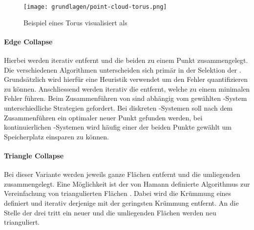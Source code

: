 \begin{figure}[H]
  \centering
  \texttt{[image: grundlagen/point-cloud-torus.png]}
  \caption{Beispiel eines Torus visualisiert als  \cite{pointCloudTorus}}
  \label{fig:pointCloudTorus}
\end{figure}

\paragraph{Edge Collapse}
Hierbei werden iterativ  entfernt und die beiden  zu einem Punkt zusammengelegt.
Die verschiedenen Algorithmen unterscheiden sich primär in der Selektion der . Grundsätzlich wird hierfür eine Heuristik verwendet um den Fehler quantifizieren zu können. Anschliessend werden iterativ die  entfernt, welche zu einem minimalen Fehler führen. Beim Zusammenführen von  sind abhängig vom gewählten -System unterschiedliche Strategien gefordert. Bei diskreten -Systemen soll nach dem Zusammenführen ein optimaler neuer Punkt gefunden werden, bei kontinuierlichen -Systemen wird häufig einer der beiden Punkte gewählt um Speicherplatz einsparen zu können.

\paragraph{Triangle Collapse}
Bei dieser Variante werden jeweils ganze Flächen entfernt und die umliegenden  zusammengelegt. Eine Möglichkeit ist der von Hamann definierte Algorithmus zur Vereinfachung von triangulierten Flächen \cite{triangleCollapseAlgorithm}. Dabei wird die Krümmung eines  definiert und iterativ derjenige  mit der geringsten Krümmung entfernt. An die Stelle der drei  tritt ein neuer  und die umliegenden Flächen werden neu trianguliert.
